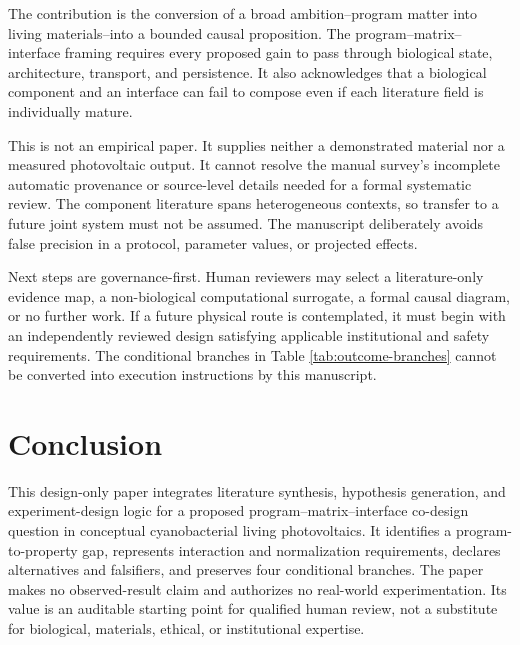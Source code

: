 \documentclass[conference]{IEEEtran}
\begin{document}
The contribution is the conversion of a broad ambition--program matter into living materials--into a bounded causal proposition. The program--matrix--interface framing requires every proposed gain to pass through biological state, architecture, transport, and persistence. It also acknowledges that a biological component and an interface can fail to compose even if each literature field is individually mature.

This is not an empirical paper. It supplies neither a demonstrated material nor a measured photovoltaic output. It cannot resolve the manual survey's incomplete automatic provenance or source-level details needed for a formal systematic review. The component literature spans heterogeneous contexts, so transfer to a future joint system must not be assumed. The manuscript deliberately avoids false precision in a protocol, parameter values, or projected effects.

Next steps are governance-first. Human reviewers may select a literature-only evidence map, a non-biological computational surrogate, a formal causal diagram, or no further work. If a future physical route is contemplated, it must begin with an independently reviewed design satisfying applicable institutional and safety requirements. The conditional branches in Table \ref{tab:outcome-branches} cannot be converted into execution instructions by this manuscript.

\section{Conclusion}

This design-only paper integrates literature synthesis, hypothesis generation, and experiment-design logic for a proposed program--matrix--interface co-design question in conceptual cyanobacterial living photovoltaics. It identifies a program-to-property gap, represents interaction and normalization requirements, declares alternatives and falsifiers, and preserves four conditional branches. The paper makes no observed-result claim and authorizes no real-world experimentation. Its value is an auditable starting point for qualified human review, not a substitute for biological, materials, ethical, or institutional expertise.
\end{document}
